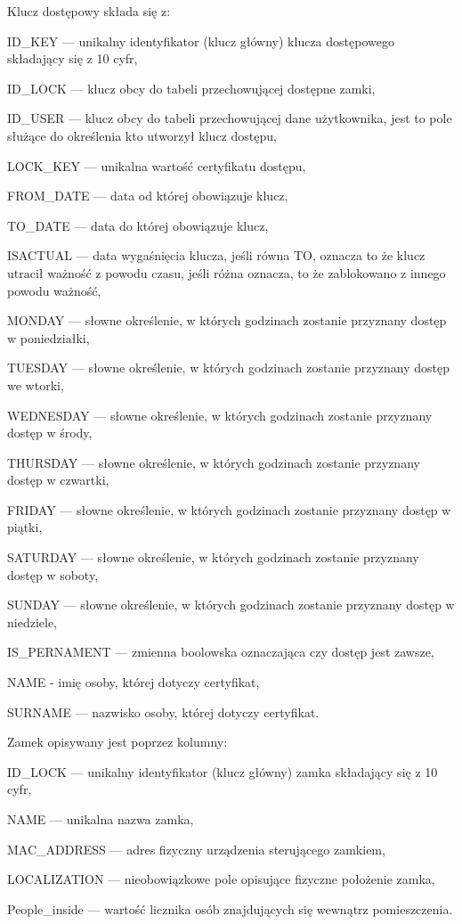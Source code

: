 	Klucz dostępowy składa się z:
	\begin{itemize*}
		\item {ID\_KEY} --- unikalny identyfikator (klucz główny) klucza dostępowego składający się z 10 cyfr,
		\item {ID\_LOCK} --- klucz obcy do tabeli przechowującej dostępne zamki,
		\item {ID\_USER} --- klucz obcy do tabeli przechowującej dane użytkownika, jest to pole służące do określenia kto utworzył klucz dostępu,
		\item {LOCK\_KEY} --- unikalna wartość certyfikatu dostępu,
		\item {FROM\_DATE} --- data od której obowiązuje klucz,
		\item {TO\_DATE} --- data do której obowiązuje klucz,
		\item {ISACTUAL} --- data wygaśnięcia klucza, jeśli równa TO, oznacza to że klucz utracił ważność z powodu czasu, jeśli różna oznacza, to że zablokowano z innego powodu ważność,
		\item {MONDAY} --- słowne określenie, w których godzinach zostanie przyznany dostęp w poniedziałki,
		\item {TUESDAY} --- słowne określenie, w których godzinach zostanie przyznany dostęp we wtorki,
		\item {WEDNESDAY} --- słowne określenie, w których godzinach zostanie przyznany dostęp w środy,
		\item {THURSDAY} --- słowne określenie, w których godzinach zostanie przyznany dostęp w czwartki,
		\item {FRIDAY} --- słowne określenie, w których godzinach zostanie przyznany dostęp w piątki,
		\item {SATURDAY} --- słowne określenie, w których godzinach zostanie przyznany dostęp w soboty,
		\item {SUNDAY} --- słowne określenie, w których godzinach zostanie przyznany dostęp w niedziele,
		\item {IS\_PERNAMENT} --- zmienna boolowska oznaczająca czy dostęp jest zawsze,
		\item {NAME} - imię osoby, której dotyczy certyfikat,
		\item {SURNAME} --- nazwisko osoby, której dotyczy certyfikat.
	\end{itemize*}

\newpage
	Zamek opisywany jest poprzez kolumny:
	\begin{itemize*}
		\item {ID\_LOCK} --- unikalny identyfikator (klucz główny) zamka składający się z 10 cyfr,
		\item {NAME} --- unikalna nazwa zamka,
		\item {MAC\_ADDRESS} --- adres fizyczny urządzenia sterującego zamkiem,
		\item {LOCALIZATION} --- nieobowiązkowe pole opisujące fizyczne położenie zamka,
		\item {People\_inside} --- wartość licznika osób znajdujących się wewnątrz pomieszczenia.
	\end{itemize*}

